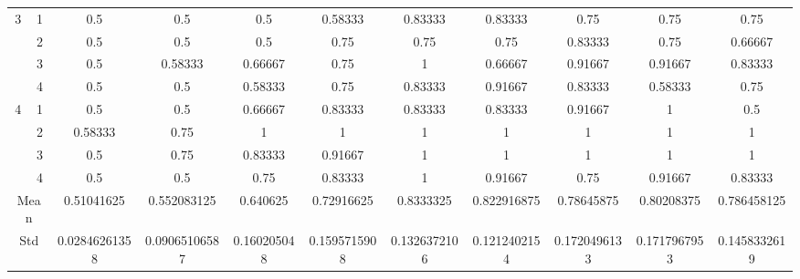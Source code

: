 \documentclass[draft,dvipsnames]{drexel-thesis}
\begin{document}
\begin{thesis}
\begin{table}[!t]
{\begin{tabular}{|c|c|c|c|c|c|c|c|c|c|c|}
\multirow{4}{*}{3}    & 1                   & 0.5           & 0.5           & 0.5         & 0.58333      & 0.83333      & 0.83333      & 0.75         & 0.75         & 0.75         \\ \cline{2-11} 
                      & 2                   & 0.5           & 0.5           & 0.5         & 0.75         & 0.75         & 0.75         & 0.83333      & 0.75         & 0.66667      \\ \cline{2-11} 
                      & 3                   & 0.5           & 0.58333       & 0.66667     & 0.75         & 1            & 0.66667      & 0.91667      & 0.91667      & 0.83333      \\ \cline{2-11} 
                      & 4                   & 0.5           & 0.5           & 0.58333     & 0.75         & 0.83333      & 0.91667      & 0.83333      & 0.58333      & 0.75         \\ \hline
\multirow{4}{*}{4}    & 1                   & 0.5           & 0.5           & 0.66667     & 0.83333      & 0.83333      & 0.83333      & 0.91667      & 1            & 0.5          \\ \cline{2-11} 
                      & 2                   & 0.58333       & 0.75          & 1           & 1            & 1            & 1            & 1            & 1            & 1            \\ \cline{2-11} 
                      & 3                   & 0.5           & 0.75          & 0.83333     & 0.91667      & 1            & 1            & 1            & 1            & 1            \\ \cline{2-11} 
                      & 4                   & 0.5           & 0.5           & 0.75        & 0.83333      & 1            & 0.91667      & 0.75         & 0.91667      & 0.83333      \\ \hline
\multicolumn{2}{|c|}{Mean}                  & 0.51041625    & 0.552083125   & 0.640625    & 0.72916625   & 0.8333325    & 0.822916875  & 0.78645875   & 0.80208375   & 0.786458125  \\ \hline
\multicolumn{2}{|c|}{Std}                   & 0.02846261358 & 0.09065106587 & 0.160205048 & 0.1595715908 & 0.1326372106 & 0.1212402154 & 0.1720496133 & 0.1717967953 & 0.1458332619 \\ \hline
\end{tabular}}
\end{table}


\end{thesis}
\end{document}
